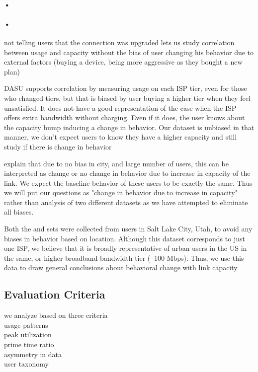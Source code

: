 \paragraph{•}

\paragraph{•}


not telling users that the connection was upgraded lets us study correlation between usage and capacity without the bias of user changing his behavior due to external factors (buying a device, being more aggressive as they bought a new plan)


DASU supports correlation by measuring usage on each ISP tier, even for those who changed tiers, but that is biased by user buying a higher tier when they feel unsatisfied. It does not have a good representation of the case when the ISP offers extra bandwidth without charging. Even if it does, the user knows about the capacity bump inducing a change in behavior. Our dataset is unbiased in that manner, we don't expect users to know they have a higher capacity and still study if there is change in behavior


 explain that due to no bias in city, and large number of users, this can be interpreted as change or no change in behavior due to increase in capacity of the link. We expect the baseline behavior of these users to be exactly the same. Thus we will put our questions as "change in behavior due to increase in capacity" rather than analysis of two different datasets as we have attempted to eliminate all biases.


Both the \test and \control sets were collected from users in Salt Lake City, Utah, to avoid any biases in behavior based on location. Although this dataset corresponds to just one ISP, we believe that it is broadly representative of urban users in the US in the same, or higher broadband bandwidth tier ($\>$ 100 Mbps). Thus, we use this data to draw general conclusions about behavioral change with link capacity 






\subsection{Evaluation Criteria}
we analyze based on three criteria\\
usage patterns\\
peak utilization\\
prime time ratio\\
asymmetry in data\\
user taxonomy


